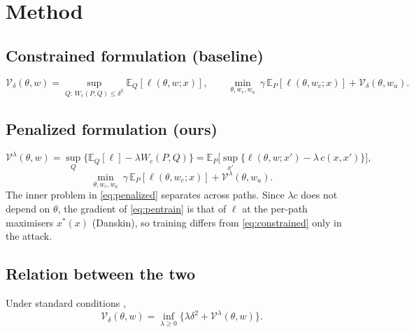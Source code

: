 \documentclass[11pt]{article}
\newif\ifshowguides
\newcommand{\guide}[1]{\ifshowguides
  \par\smallskip\noindent\fcolorbox{gray!50}{gray!6}{\parbox{\dimexpr\linewidth-2\fboxsep-2\fboxrule}{\small\itshape\color{gray!80!black}#1}}\par\smallskip\fi}
\newcommand{\E}{\mathbb{E}}
\begin{document}
\section{Method}\label{sec:method}

\subsection{Constrained formulation (baseline)}
\begin{equation}\label{eq:constrained}
\mathcal{V}_\delta(\theta,w)=\sup_{Q:\,W_c(P,Q)\le\delta^2}\E_Q[\ell(\theta,w;x)],\qquad
\min_{\theta,w_c,w_a}\ \gamma\,\E_P[\ell(\theta,w_c;x)]+\mathcal{V}_\delta(\theta,w_a).
\end{equation}
\guide{Approximated in \cite{he2025} by a 20-iteration budget attack with one shared budget across
paths, projected onto the ball (step size $4\delta/20$).}

\subsection{Penalized formulation (ours)}
\begin{equation}\label{eq:penalized}
\mathcal{V}^\lambda(\theta,w)=\sup_Q\big\{\E_Q[\ell]-\lambda W_c(P,Q)\big\}
=\E_P\Big[\sup_{x'}\big\{\ell(\theta,w;x')-\lambda\,c(x,x')\big\}\Big],
\end{equation}
\begin{equation}\label{eq:pentrain}
\min_{\theta,w_c,w_a}\ \gamma\,\E_P[\ell(\theta,w_c;x)]+\mathcal{V}^\lambda(\theta,w_a).
\end{equation}
The inner problem in \eqref{eq:penalized} separates across paths. Since $\lambda c$ does not
depend on $\theta$, the gradient of \eqref{eq:pentrain} is that of $\ell$ at the per-path
maximisers $x^*(x)$ (Danskin), so training differs from \eqref{eq:constrained} only in the attack.

\subsection{Relation between the two}
Under standard conditions \cite{blanchet2019,gao2023},
\begin{equation}\label{eq:duality}
\mathcal{V}_\delta(\theta,w)=\inf_{\lambda\ge0}\big\{\lambda\delta^2+\mathcal{V}^\lambda(\theta,w)\big\}.
\end{equation}
\guide{Interpretation: the constrained problem is the penalized one with a multiplier that is
re-optimised for every $\theta$. Fixing $\lambda$ instead fixes the PRICE of transport, so the
realised radius changes as the network changes. This is the mechanism behind research question
(2): it may make performance less sensitive to the hyperparameter, or weaken the adversary.}
\end{document}
